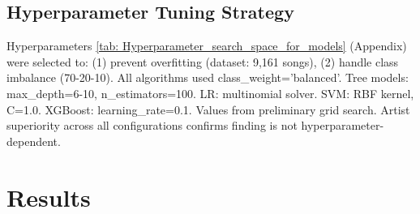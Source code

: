 \documentclass{article}
\begin{document}
\subsection{Hyperparameter Tuning Strategy}
Hyperparameters \ref{tab: Hyperparameter_search_space_for_models} (Appendix) were selected to: (1) prevent overfitting (dataset: 9,161 songs), (2) handle class imbalance (70-20-10). All algorithms used class\_weight='balanced'. Tree models: max\_depth=6-10, n\_estimators=100. LR: multinomial solver. SVM: RBF kernel, C=1.0. XGBoost: learning\_rate=0.1. Values from preliminary grid search. Artist superiority across all configurations confirms finding is not hyperparameter-dependent.

\section{Results}

\end{document}
